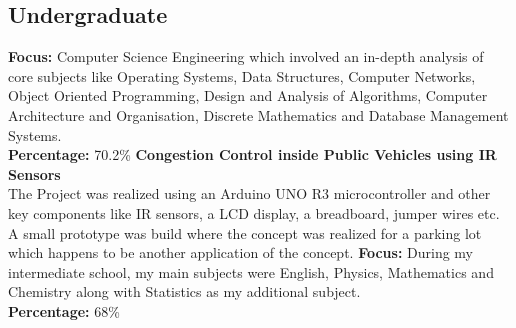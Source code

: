 \documentclass[
  a4paper, 
]{fortysecondscv}
\begin{document}
\makefrontsidebar


\subsection{Undergraduate}
\begin{cvtable}
		{\textbf{Focus:} Computer Science Engineering which involved an in-depth analysis of core subjects like Operating Systems, Data Structures, Computer Networks, Object Oriented Programming, Design and Analysis of Algorithms, Computer Architecture and Organisation, Discrete Mathematics and  Database Management Systems.\\ \textbf{Percentage:} 70.2\%}
		{\textbf{Congestion Control inside Public Vehicles using IR Sensors} \\ The Project was realized using an Arduino UNO R3 microcontroller and other key components like IR sensors, a LCD display, a breadboard, jumper wires etc. A small prototype was build where the concept was realized for a parking lot which happens to be another application of the concept.}
		{\textbf{Focus:} During my intermediate school, my main subjects were English, Physics, Mathematics and Chemistry along with Statistics as my additional subject.\\ \textbf{Percentage:} 68\%}
	
\end{cvtable}
\end{document}
